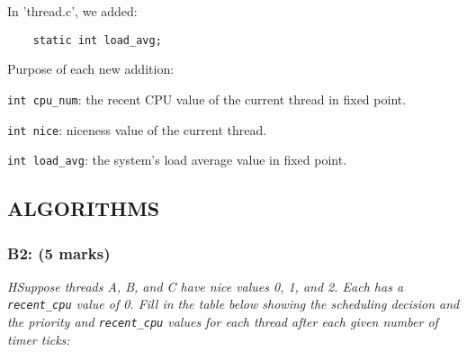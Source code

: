 \documentclass{article}
\begin{document}
In 'thread.c', we added:
\begin{lstlisting}
    static int load_avg;
\end{lstlisting}

Purpose of each new addition:

\texttt{int cpu\_num}: the recent CPU value of the current thread in fixed point.

\texttt{int nice}: niceness value of the current thread.

\texttt{int load\_avg}: the system's load average value in fixed point.


\subsection{ALGORITHMS}

\subsubsection*{B2: (5 marks) }
\textit{HSuppose threads A, B, and C have nice values 0, 1, and 2.  Each has a \texttt{recent\_cpu} value of 0.  Fill in the table below showing the scheduling decision and the priority and \texttt{recent\_cpu} values for each thread after each given number of timer ticks:}
\end{document}
